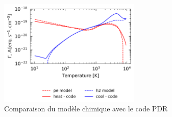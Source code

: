 \begin{figure}[!h]
    \centering \includegraphics[trim = {0 0 0 0cm},clip,width=0.6\textwidth]{figure/H2/pic/model.png}
    \caption{Comparaison du modèle chimique avec le code PDR}
    \label{fig:H2:meca:chim}
\end{figure}







